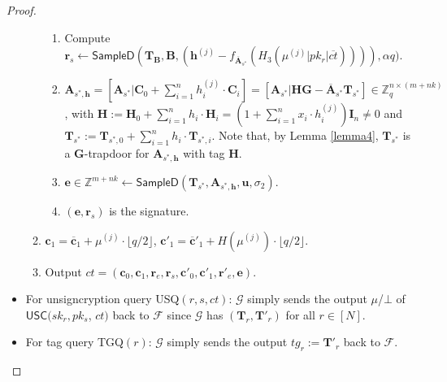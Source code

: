 \documentclass[a4paper,11pt,onecolumn]{elsarticle}
\def\bf{\mathbf}
\begin{document}
\begin{proof}
\begin{itemize}
\begin{enumerate}
\begin{enumerate}
			\item Compute ${\textbf{r}_s} \leftarrow \textsf{SampleD}(\textbf{T}_\textbf{B}, \textbf{B}, (\textbf{h}^{(j)}-f_{\overline{\textbf{A}}_{s^*}}(H_3(\mu^{(j)}| pk_r|\overline{ct})))),\alpha q)$.
			\item $\textbf{A}_{{s^*},\textbf{h}}=[\mathbf{A}_{s^*}|\mathbf{C}_0+\sum_{i=1}^{n}h_i^{(j)}\cdot \mathbf{C}_i]=[\mathbf{A}_{s^*}|\textbf{H} \textbf{G}-\overline{\textbf{A}}_{s^*}\textbf{T}_{s^*}]\in \mathbb{Z}_q^{n \times (m+nk)}$, with $\textbf{H}:=\mathbf{H}_0+\sum_{i=1}^{n}h_i\cdot \mathbf{H}_{i}=(1+\sum_{i=1}^{n}x_i \cdot h_i^{(j)})\textbf{I}_n \neq 0$ and $\textbf{T}_{s^*}:=\mathbf{T}_{s^*,0}+\sum_{i=1}^{n}h_i\cdot \mathbf{T}_{s^*,i}$. Note that,	by Lemma \ref{lemma4},  $\textbf{T}_{s^*}$ is a $\textbf{G}$-trapdoor for $\textbf{A}_{{s^*},\textbf{h}}$ with tag $\textbf{H}$. %
			\item $\textbf{e} \in \mathbb{Z}^{ m+nk} \leftarrow \textsf{SampleD}(\textbf{T}_{s^*}, \textbf{A}_{{s^*},\textbf{h}},\textbf{u},\sigma_2)$.
			\item $(\textbf{e},\textbf{r}_s)$ is the signature.
		\end{enumerate}
			\item  $\textbf{c}_1=\overline{\textbf{c}}_1+ \mu^{(j)} \cdot \lfloor q/2\rfloor$, \quad $\textbf{c}'_1=\overline{\textbf{c}}'_1+ H(\mu^{(j)}) \cdot \lfloor q/2\rfloor$.
		\item Output $ct=(\textbf{c}_0, \textbf{c}_1, \textbf{r}_e, \textbf{r}_s,\textbf{c}'_0, \textbf{c}'_1,\textbf{r}'_e, \textbf{e})$.
		\end{enumerate}
							
		\item For unsigncryption query USQ$(r,s,ct)$: $\mathcal{G}$ simply sends the output $\mu$/$\bot$ of $\textsf{USC}(sk_{r},pk_{s}$, $ct)$ back to $\mathcal{F}$ since $\mathcal{G}$ has $(\bf{T}_r,\bf{T}'_r)$ for all $r \in [N]$.
					
		\item For tag query TGQ$(r)$: $\mathcal{G}$ simply sends the output $tg_{r}:=\bf{T}'_r$ back to $\mathcal{F}$.
			\end{itemize}
			

\end{proof}
\end{document}
